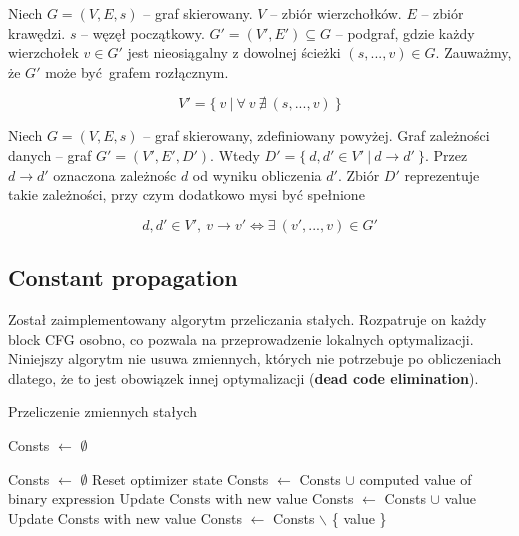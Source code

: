 \documentclass[leqno, 12pt]{article}
\newcommand{\spacing}{\vskip 0.5cm}
\begin{document}
			Niech $G = (V, E, s)$ -- graf skierowany.
			$V$ -- zbiór wierzchołków. $E$ -- zbiór krawędzi. $s$ -- węzęł początkowy.
			$G' = (V', E') \subseteq G$ -- podgraf, gdzie każdy wierzchołek $v \in G'$ jest nieosiągalny z
			dowolnej ścieżki $(s, ...,  v) \in G$. Zauważmy, że $G'$ może być grafem rozłącznym.

			$$V' = \{ \ v \ | \ \forall \ v \ \nexists \ (s, ..., v) \ \}$$

			\spacing

			Niech $G = (V, E, s)$ -- graf skierowany, zdefiniowany powyżej. Graf zależności danych -- graf
			$G' = (V', E', D')$. Wtedy $D' = \{ \ d, d' \in V' \ | \ d \rightarrow d' \ \}$. Przez $d \rightarrow d'$
			oznaczona zależnośc $d$ od wyniku obliczenia $d'$. Zbiór $D'$ reprezentuje takie zależności, przy czym
			dodatkowo mysi być spełnione

			$$d, d' \in V', \ v \rightarrow v' \iff \exists \ (v', ..., v) \in G' $$

			\newpage
	
		\subsection{Constant propagation}
		
			Został zaimplementowany algorytm przeliczania stałych. Rozpatruje on każdy block CFG osobno,
			co pozwala na przeprowadzenie lokalnych optymalizacji. Niniejszy algorytm nie usuwa zmiennych,
			których nie potrzebuje po obliczeniach dlatego, że to jest obowiązek innej optymalizacji
			(\textbf{dead code elimination}). 

			\spacing
		
			\begin{algorithm}
				\caption{Przeliczenie zmiennych stałych}
				\begin{algorithmic}[1]

					\State Consts $\gets$ $\emptyset$
					
							\State Consts $\gets$ $\emptyset$
							\Comment Reset optimizer state
						\EndIf
							\State Consts $\gets$ Consts $\cup$ computed value of binary expression
						\EndIf
									\State Update Consts with new value
								\Else
									\State Consts $\gets$ Consts $\cup$ value
								\EndIf
							\EndIf
									\State Update Consts with new value
								\Else
									\State Consts $\gets$ Consts $\backslash$ \{ value \}
								\EndIf
							\EndIf
						\EndIf
					\EndFor
				\EndProcedure

				\end{algorithmic}
			\end{algorithm}
		
\end{document}
